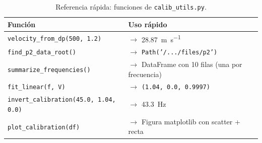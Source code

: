 \documentclass[12pt,a4paper]{article}
\begin{document}
\begin{table}[H]
	\centering
	\caption{Referencia rápida: funciones de \texttt{calib\_utils.py}.}
	\label{tab:ref_python}
	\small
	\begin{tabularx}{\textwidth}{l X}
		\toprule
		\textbf{Función} & \textbf{Uso rápido}                                       \\
		\midrule
		\texttt{velocity\_from\_dp(500, 1.2)}
		                 & $\rightarrow$ \SI{28.87}{\m\per\s}                        \\
		\texttt{find\_p2\_data\_root()}
		                 & $\rightarrow$ \texttt{Path('/.../files/p2')}              \\
		\texttt{summarize\_frequencies()}
		                 & $\rightarrow$ DataFrame con 10 filas (una por frecuencia) \\
		\texttt{fit\_linear(f, V)}
		                 & $\rightarrow$ \texttt{(1.04, 0.0, 0.9997)}                \\
		\texttt{invert\_calibration(45.0, 1.04, 0.0)}
		                 & $\rightarrow$ \SI{43.3}{\Hz}                              \\
		\texttt{plot\_calibration(df)}
		                 & $\rightarrow$ Figura matplotlib con scatter + recta       \\
		\bottomrule
	\end{tabularx}
\end{table}
\end{document}
